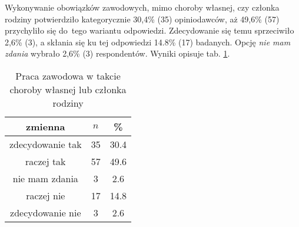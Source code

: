 

Wykonywanie obowiązków zawodowych, mimo choroby własnej, czy członka rodziny potwierdziło kategorycznie 30,4\% (35) opiniodawców, aż 49,6\% (57) przychyliło się do~tego wariantu odpowiedzi. Zdecydowanie się temu sprzeciwiło 2,6\% (3), a skłania się ku tej odpowiedzi 14.8\% (17) badanych. Opcję \textit{nie mam zdania} wybrało 2,6\% (3) respondentów.
Wyniki opisuje tab. \ref{tab:Q31}.


\begin{table}[H]
\caption{Praca zawodowa w takcie choroby własnej lub członka rodziny}
\centering
\begin{tabular}{ | c | c | c |}
\hline
zmienna & $n$ & \% \\
\hline
zdecydowanie tak  &  35  & 30.4\\
\hline
raczej tak  &  57  & 49.6\\
\hline
nie mam zdania  &  3  & 2.6\\
\hline
raczej nie  &  17  & 14.8 \\
\hline
zdecydowanie nie  &  3  & 2.6 \\
\hline
\end{tabular}
\label{tab:Q31}
\end{table}
